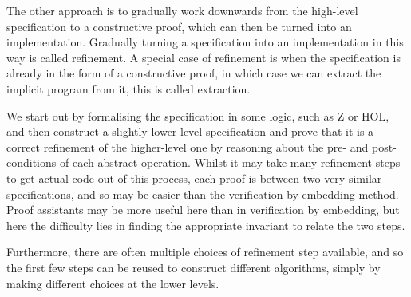 The other approach is to gradually work downwards from the high-level
specification to a constructive proof, which can then be turned into
an implementation. Gradually turning a specification into an
implementation in this way is called refinement. A special case of
refinement is when the specification is already in the form of a
constructive proof, in which case we can extract the implicit program
from it, this is called extraction.

We start out by formalising the specification in some logic, such as Z
or HOL, and then construct a slightly lower-level specification and
prove that it is a correct refinement of the higher-level one by
reasoning about the pre- and post-conditions of each abstract
operation\cite{Woodcock96}. Whilst it may take many refinement steps
to get actual code out of this process, each proof is between two very
similar specifications, and so may be easier than the verification by
embedding method. Proof assistants may be more useful here than in
verification by embedding, but here the difficulty lies in finding the
appropriate invariant to relate the two steps\cite{Woodcock96}.

Furthermore, there are often multiple choices of refinement step
available, and so the first few steps can be reused to construct
different algorithms, simply by making different choices at the lower
levels\cite{Myreen10}.

